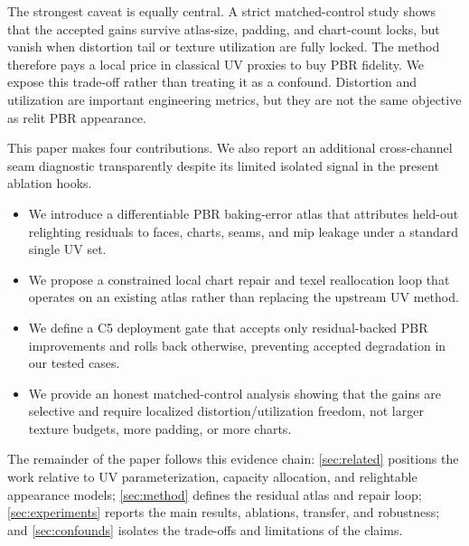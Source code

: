The strongest caveat is equally central. A strict matched-control study shows that the accepted gains survive atlas-size, padding, and chart-count locks, but vanish when distortion tail or texture utilization are fully locked. The method therefore pays a local price in classical UV proxies to buy PBR fidelity. We expose this trade-off rather than treating it as a confound. Distortion and utilization are important engineering metrics, but they are not the same objective as relit PBR appearance.

This paper makes four contributions. We also report an additional cross-channel seam diagnostic transparently despite its limited isolated signal in the present ablation hooks.
\begin{itemize}
  \item We introduce a differentiable PBR baking-error atlas that attributes held-out relighting residuals to faces, charts, seams, and mip leakage under a standard single UV set.
  \item We propose a constrained local chart repair and texel reallocation loop that operates on an existing atlas rather than replacing the upstream UV method.
  \item We define a C5 deployment gate that accepts only residual-backed PBR improvements and rolls back otherwise, preventing accepted degradation in our tested cases.
  \item We provide an honest matched-control analysis showing that the gains are selective and require localized distortion/utilization freedom, not larger texture budgets, more padding, or more charts.
\end{itemize}

The remainder of the paper follows this evidence chain: \cref{sec:related} positions the work relative to UV parameterization, capacity allocation, and relightable appearance models; \cref{sec:method} defines the residual atlas and repair loop; \cref{sec:experiments} reports the main results, ablations, transfer, and robustness; and \cref{sec:confounds} isolates the trade-offs and limitations of the claims.
